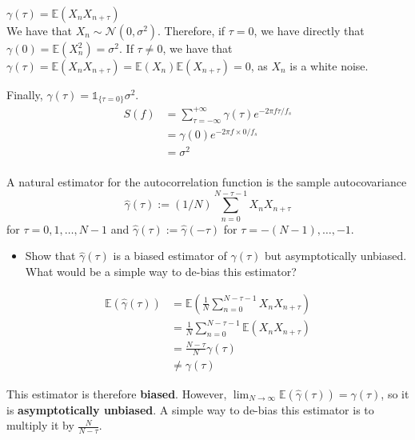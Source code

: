 \documentclass[11pt]{article}
\begin{document}
\begin{solution}

$\gamma (\tau) = \mathbb{E}(X_n X_{n+\tau})$\\
We have that $X_n \sim \mathcal{N}(0, \sigma^2)$. Therefore, if $\tau = 0$, we have directly that $\gamma(0) = \mathbb{E}(X_n^2) = \sigma^2$. If $\tau \neq 0$, we have that $\gamma(\tau) = \mathbb{E}(X_n X_{n+\tau}) = \mathbb{E}(X_n) \mathbb{E}(X_{n+\tau}) = 0$, as $X_n$ is a white noise. 

Finally, $\gamma(\tau) = \mathbb{1}_{ \{\tau=0\}} \sigma^2$.\\

\begin{align}
    S(f) &= \sum_{\tau=-\infty}^{+\infty}\gamma(\tau)e^{-2\pi f\tau/f_s} \\
    &= \gamma(0) e^{-2\pi f \times 0/f_s} \\
    &= \sigma^2\\
\end{align}

\end{solution}


\begin{exercise}
A natural estimator for the autocorrelation function is the sample autocovariance
\begin{equation}
    \hat{\gamma}(\tau) := (1/N) \sum_{n=0}^{N-\tau-1} X_n X_{n+\tau}
\end{equation}
for $\tau=0,1,\dots,N-1$ and $\hat{\gamma}(\tau):=\hat{\gamma}(-\tau)$ for $\tau=-(N-1),\dots,-1$.
\begin{itemize}
    \item Show that $\hat{\gamma}(\tau)$ is a biased estimator of $\gamma(\tau)$ but asymptotically unbiased.
    What would be a simple way to de-bias this estimator?
\end{itemize}

\end{exercise}

\begin{solution}

    \begin{align}
        \mathbb{E}(\hat{\gamma} (\tau)) &= \mathbb{E}(\frac{1}{N} \sum_{n=0}^{N-\tau-1} X_n X_{n+\tau})\\
        &= \frac{1}{N} \sum_{n=0}^{N-\tau-1} \mathbb{E}(X_n X_{n+\tau})\\
        &= \frac{N-\tau}{N} \gamma(\tau)\\
        &  \neq \gamma(\tau)    
    \end{align}

    This estimator is therefore \textbf{biased}. However, $\lim_{N \to \infty} \mathbb{E}(\hat{\gamma}(\tau)) = \gamma(\tau)$, so it is \textbf{asymptotically unbiased}. A simple way to de-bias this estimator is to multiply it by $\frac{N}{N-\tau}$.
\end{solution}
\end{document}
